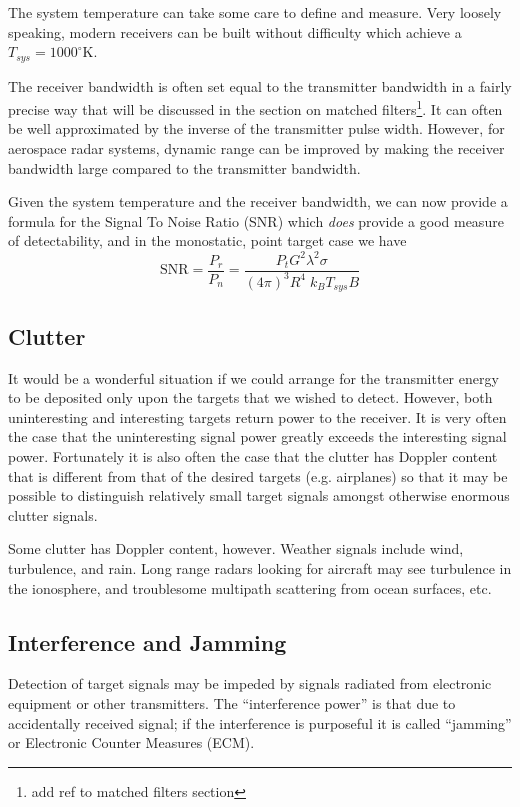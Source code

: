 The system temperature can take some care to define and measure.  Very
loosely speaking, modern receivers can be built without difficulty
which achieve a $T_{sys} = 1000 ^\circ$K.

The receiver bandwidth is often set equal to the transmitter bandwidth
in a fairly precise way that will be discussed in the section on
matched filters\footnote{add ref to matched filters section}.  It can
often be well approximated by the inverse of the transmitter pulse
width.  However, for aerospace radar systems, dynamic range can be improved by making the
receiver bandwidth large compared to the transmitter bandwidth.

Given the system temperature and the receiver bandwidth, we can now
provide a formula for the Signal To Noise Ratio (SNR) which
\textit{does} provide a good measure of detectability, and in the
monostatic, point target case we have
\begin{equation}
\textrm{SNR} = \frac{P_r}{P_n} = \frac{P_t G^2 \lambda^2
  \sigma}{(4\pi)^3 R^4 \; k_B T_{sys} B}
\end{equation}

\subsection{Clutter} 

It would be a wonderful situation if we could arrange for the
transmitter energy to be deposited only upon the targets that we
wished to detect.  However, both uninteresting and interesting targets 
return power to the receiver.  It is very often the case that the
uninteresting signal power greatly exceeds the interesting signal
power.  Fortunately it is also often the case that the clutter has
Doppler content that is different from that of the desired targets
(e.g. airplanes) so that it may be possible to distinguish relatively
small target signals amongst otherwise enormous clutter signals.

Some clutter has Doppler content, however.  Weather signals include
wind, turbulence, and rain.  Long range radars looking for aircraft
may see turbulence in the ionosphere, and troublesome multipath
scattering from ocean surfaces, etc.

\subsection{Interference and Jamming}

Detection of target signals may be impeded by signals radiated from
electronic equipment or other transmitters.  The ``interference
power'' is that due to accidentally received signal; if the
interference is purposeful it is called ``jamming'' or Electronic Counter Measures (ECM).

